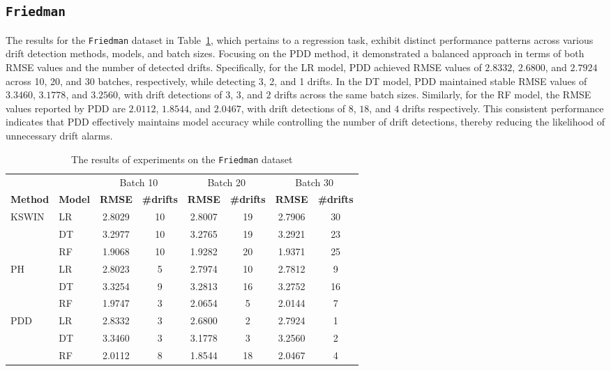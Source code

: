 \documentclass[pdflatex,sn-mathphys-ay]{sn-jnl}%
\theoremstyle{thmstyleone}%
\theoremstyle{thmstyletwo}%
\theoremstyle{thmstylethree}%
\begin{document}
\subsection*{\texttt{Friedman}}

The results for the \texttt{Friedman} dataset in Table~\ref{tab:exp_Friedman}, which pertains to a regression task, exhibit distinct performance patterns across various drift detection methods, models, and batch sizes. Focusing on the PDD method, it demonstrated a balanced approach in terms of both RMSE values and the number of detected drifts. Specifically, for the LR model, PDD achieved RMSE values of $2.8332$, $2.6800$, and $2.7924$ across 10, 20, and 30 batches, respectively, while detecting 3, 2, and 1 drifts. In the DT model, PDD maintained stable RMSE values of $3.3460$, $3.1778$, and $3.2560$, with drift detections of $3$, $3$, and $2$ drifts across the same batch sizes. Similarly, for the RF model, the RMSE values reported by PDD are $2.0112$, $1.8544$, and $2.0467$, with drift detections of $8$, $18$, and $4$ drifts respectively. This consistent performance indicates that PDD effectively maintains model accuracy while controlling the number of drift detections, thereby reducing the likelihood of unnecessary drift alarms.

\begin{table}[h]
    \centering
    \scriptsize
    \caption{The results of experiments on the \texttt{Friedman} dataset}
    \label{tab:exp_Friedman}
    \begin{tabular}{llcccccc}\toprule
 & & \multicolumn{2}{c}{Batch 10} & \multicolumn{2}{c}{Batch 20} & \multicolumn{2}{c}{Batch 30} \\\cmidrule(lr){3-4}\cmidrule(lr){5-6}\cmidrule(lr){7-8}
\textbf{Method} & \textbf{Model} & \textbf{RMSE} & \textbf{\#drifts} & \textbf{RMSE} & \textbf{\#drifts} & \textbf{RMSE} & \textbf{\#drifts} \\\midrule
\multirow{3}{*}{KSWIN} 
  & LR   & 2.8029 & 10   & 2.8007 & 19   & 2.7906 & 30   \\
  & DT   & 3.2977 & 10   & 3.2765 & 19   & 3.2921 & 23   \\
  & RF   & 1.9068 & 10   & 1.9282 & 20   & 1.9371 & 25   \\\midrule
\multirow{3}{*}{PH}
  & LR   & 2.8023 & 5    & 2.7974 & 10   & 2.7812 & 9    \\
  & DT   & 3.3254 & 9    & 3.2813 & 16   & 3.2752 & 16   \\
  & RF   & 1.9747 & 3    & 2.0654 & 5    & 2.0144 & 7    \\\midrule
\multirow{3}{*}{PDD}
  & LR   & 2.8332 & 3    & 2.6800 & 2    & 2.7924 & 1    \\
  & DT   & 3.3460 & 3    & 3.1778 & 3    & 3.2560 & 2    \\
  & RF   & 2.0112 & 8    & 1.8544 & 18   & 2.0467 & 4    \\\bottomrule
\end{tabular}
\end{table}
\end{document}
